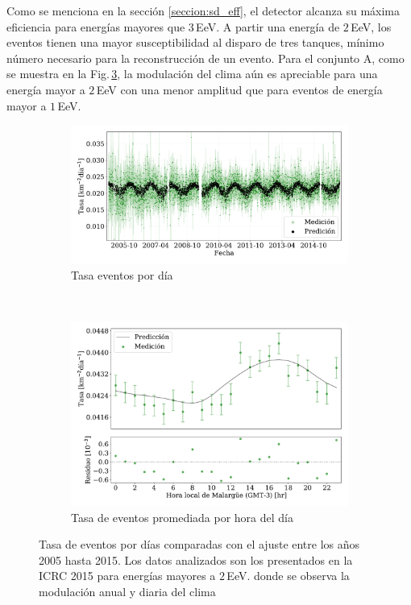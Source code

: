         Como se menciona en la sección \ref{seccion:sd_eff}, el detector alcanza su máxima eficiencia para energías mayores que 3\,EeV. A partir una energía de $2\,$EeV, los eventos tienen una mayor susceptibilidad al disparo de tres tanques, mínimo número necesario para la reconstrucción de un evento. Para el conjunto A, como se muestra en la Fig.\,\ref{fig:rate_2015_05-15_2EeV}, la modulación del clima aún es apreciable para una energía mayor a $2\,$EeV con una menor amplitud que para eventos de energía mayor a $1\,$EeV. 

        \begin{figure}[H]
            \centering
            \begin{subfigure}[b]{0.875\textwidth}
            \includegraphics[width=\textwidth]{Graphs/rate_dayly/herald_old_above_2EeV_rate_day.pdf}
            \caption{Tasa eventos por día}\label{fig:rate_dayly_ICRC_2015_2EeV}
            \end{subfigure}\\
            \begin{subfigure}[b]{0.875\textwidth}
            \includegraphics[width=\textwidth]{Graphs/rate_hour_of_the_day/herald_old_above_2EeV_hour_of_the_day.pdf}
            \caption{Tasa de eventos promediada por hora del día }\label{fig:rate_hod_ICRC_2015_2EeV}
            \end{subfigure}%
            \caption{Tasa de eventos por días comparadas con el ajuste entre los años 2005 hasta 2015. Los datos analizados son los presentados en la ICRC 2015 para energías mayores a $2\,$EeV. donde se observa la modulación anual y diaria del clima }\label{fig:rate_2015_05-15_2EeV}
        \end{figure}

